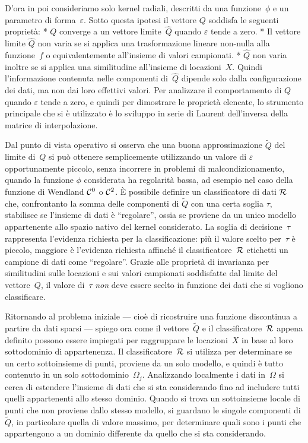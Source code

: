 D’ora in poi consideriamo solo kernel radiali, descritti da una funzione~$\phi$ e un parametro di forma~$\varepsilon$.
 Sotto questa ipotesi il  vettore $Q$  soddisfa le seguenti proprietà:
\begitems
* $Q$ converge a un vettore limite~$\widehat Q$ quando $\varepsilon$ tende a zero.
* Il vettore limite $\widehat Q$ non varia se si applica una trasformazione lineare non-nulla alla funzione~$f$ o equivalentemente all’insieme di valori campionati.
* $\widehat Q$ non varia inoltre se si applica una similitudine all’insieme di locazioni~$X$.
\enditems
Quindi l’informazione contenuta nelle componenti di~$\widehat Q$ dipende solo dalla configurazione dei dati, ma non dai loro effettivi valori.
Per analizzare il comportamento di $Q$ quando $\varepsilon$ tende a zero, e quindi per dimostrare le proprietà elencate, lo strumento principale che si è utilizzato è lo sviluppo in serie di Laurent dell’inversa della matrice di interpolazione.


Dal punto di vista operativo si osserva che una buona approssimazione $\tilde Q$ del limite di~$Q$ si può ottenere semplicemente utilizzando un valore di $\varepsilon$ opportunamente piccolo, senza incorrere in problemi di malcondizionamento, quando la funzione $\phi$ considerata ha regolarità bassa, ad esempio nel caso della funzione di Wendland ${\cal C}^0$ o ${\cal C}^2$.
È possibile definire un classificatore di dati $\cal R$ che, confrontanto la somma delle componenti di $\tilde Q$ con una certa soglia $\tau$, stabilisce se l’insieme di dati è “regolare”, ossia se proviene da un unico modello appartenente allo spazio nativo del kernel considerato.  
 La soglia di decisione~$\tau$ rappresenta l’evidenza richiesta per la classificazione:  più il valore scelto per~$\tau$ è piccolo, maggiore è l’evidenza richiesta affinché il classificatore~$\cal R$ etichetti un campione di dati come “regolare”.  Grazie alle proprietà di invarianza per similitudini sulle locazioni e sui valori campionati soddisfatte dal limite del vettore~$Q$, il valore di~$\tau$ {\em non} deve essere scelto in funzione dei dati che si vogliono classificare.



Ritornando al problema iniziale --- cioè di ricostruire una funzione discontinua a partire da dati sparsi --- spiego ora come il vettore~$\tilde Q$ e il classificatore~$\cal R$ appena definito possono essere impiegati per raggruppare le locazioni~$X$ in base al loro sottodominio di appartenenza.
Il classificatore~$\cal R$ si utilizza per determinare se un certo sottoinsieme di punti,  proviene da un solo modello, e quindi è tutto contenuto in un solo sottodominio~$\Omega_j$.
Analizzando localmente i dati in~$\Omega$ si cerca di estendere l’insieme di dati che si sta considerando fino ad includere tutti quelli appartenenti allo stesso dominio.
Quando si trova un sottoinsieme locale di punti che non proviene dallo stesso modello, si guardano le singole componenti di $\tilde Q$, in particolare quella di valore massimo, per determinare quali sono i punti che appartengono a un dominio differente da quello che si sta considerando.


